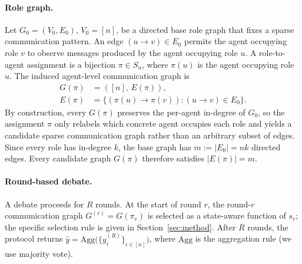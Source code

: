 \paragraph{Role graph.}
Let
    $G_0=(V_0,E_0)$, $V_0=[n]$,
be a directed base role graph that fixes a sparse communication pattern. 
An edge $(u\!\to\!v)\in E_0$ permits the agent occupying role $v$ to observe messages produced by the agent occupying role $u$. A role-to-agent assignment is a bijection $\pi\in S_n$, where $\pi(u)$ is the agent occupying role $u$. The induced agent-level communication graph is
\begin{align*}
    G(\pi) &= ([n],\,E(\pi)),\\
    E(\pi) &= \{(\pi(u)\!\to\!\pi(v)):(u\!\to\!v)\in E_0\}.
\end{align*}
By construction, every $G(\pi)$ preserves the per-agent in-degree of $G_0$, so the assignment $\pi$ only relabels which concrete agent occupies each role and yields a candidate sparse communication graph rather than an arbitrary subset of edges.
Since every role has in-degree $k$, the base graph has
\(
    m := |E_0| = nk
\)
directed edges. Every candidate graph $G(\pi)$ therefore satisfies
$|E(\pi)|=m$.

\paragraph{Round-based debate.}
A debate proceeds for $R$ rounds. At the start of round $r$, the round-$r$ communication graph $G^{(r)}=G(\pi_r)$ is selected as a state-aware function of $s_r$; the specific selection rule is given in Section~\ref{sec:method}. After $R$ rounds, the protocol returns $\hat{y}=\mathrm{Agg}\big(\{y_i^{(R)}\}_{i\in[n]}\big)$, where $\mathrm{Agg}$ is the aggregation rule (we use majority vote).